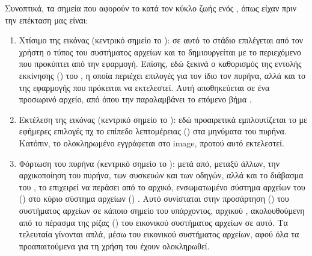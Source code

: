 Συνοπτικά, τα σημεία που αφορούν το  κατά τον κύκλο ζωής
ενός \osv{} , όπως είχαν πριν την επέκταση μας είναι:
\begin{enumerate}
    \item Χτίσιμο της εικόνας (κεντρικό σημείο το ): σε αυτό
          το στάδιο επιλέγεται από τον χρήστη ο τύπος του συστήματος αρχείων
          και το  δημιουργείται με το περιεχόμενο που
          προκύπτει από την εφαρμογή. Επίσης, εδώ ξεκινά ο καθορισμός της
          εντολής εκκίνησης () του , η οποία
          περιέχει επιλογές για τον ίδιο τον πυρήνα, αλλά και το  της εφαρμογής που πρόκειται να εκτελεστεί. Αυτή αποθηκεύεται
          σε ένα προσωρινό αρχείο, από όπου την παραλαμβάνει το επόμενο βήμα
          \cite{osv-wiki:osv-components}.
    \item Εκτέλεση της εικόνας (κεντρικό σημείο το ): εδώ
          προαιρετικά εμπλουτίζεται το  με εφήμερες επιλογές
          πχ το επίπεδο λεπτομέρειας () στα μηνύματα του πυρήνα.
          Κατόπιν, το ολοκληρωμένο  εγγράφεται στο image,
          προτού αυτό εκτελεστεί.
    \item Φόρτωση του πυρήνα (κεντρικό σημείο το ): μετά από,
          μεταξύ άλλων, την αρχικοποίηση του πυρήνα, των συσκευών και των
          οδηγών, αλλά και το διάβασμα του , το \osv{}
          επιχειρεί να περάσει από το αρχικό, ενσωματωμένο σύστημα αρχείων του
          () στο κύριο σύστημα αρχείων ()
          \cite{osv-wiki:osv-loader}. Αυτό συνίσταται στην προσάρτηση
          () του συστήματος αρχείων σε κάποιο σημείο του
          υπάρχοντος, αρχικού , ακολουθούμενη από το πέρασμα της ρίζας
          () του εικονικού συστήματος αρχείων σε αυτό. Τα τελευταία
          γίνονται απλά, μέσω του εικονικού συστήματος αρχείων, αφού όλα τα
          προαπαιτούμενα για τη χρήση του έχουν ολοκληρωθεί.
\end{enumerate}

